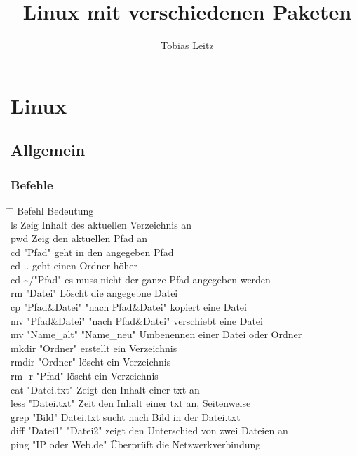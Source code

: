 \documentclass[10pt,a4paper,twoside]{book}
\author{Tobias Leitz}
\title{Linux mit verschiedenen Paketen}
\begin{document}
\maketitle
\tableofcontents
\part{Linux}
\chapter{Allgemein}
\section{Befehle}
\begin{tabbing}
\hspace*{1mm} \=\hspace{60mm} \= \kill
\> Befehl \> Bedeutung \\
\> ls \> Zeig Inhalt des aktuellen Verzeichnis an\\
\> pwd \> Zeig den aktuellen Pfad an\\
\> cd "Pfad" \> geht in den angegeben Pfad\\
\> cd .. \> geht einen Ordner höher\\
\> cd \textasciitilde /"Pfad" \> es muss nicht der ganze Pfad angegeben werden\\
\> rm "Datei" \> Löscht die angegebne Datei\\
\> cp "Pfad\&Datei" "nach Pfad\&Datei" \> kopiert eine Datei\\ 
\> mv "Pfad\&Datei" "nach Pfad\&Datei" \> verschiebt eine Datei\\
\> mv "Name\_alt" "Name\_neu" \> Umbenennen einer Datei oder Ordner \\
\> mkdir "Ordner" \> erstellt ein Verzeichnis\\
\> rmdir "Ordner" \> löscht ein Verzeichnis\\
\> rm -r "Pfad" \> löscht ein Verzeichnis\\
\> cat "Datei.txt" \> Zeigt den Inhalt einer txt an\\
\> less "Datei.txt" \> Zeit den Inhalt einer txt an, Seitenweise\\
\> grep "Bild" Datei.txt \> sucht nach Bild in der Datei.txt\\
\> diff "Datei1" "Datei2" \> zeigt den Unterschied von zwei Dateien an\\
\> ping "IP oder Web.de" \> Überprüft die Netzwerkverbindung \\

\end{tabbing}
\end{document}
